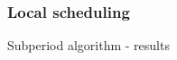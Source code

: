 \documentclass[]{prezentare}
\begin{document}
\begin{frame}
	\frametitle{Local scheduling}
	\begin{block}{Subperiod algorithm - results}
	
	\end{block}
\end{frame}

\end{document}
